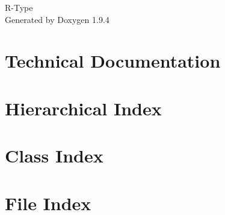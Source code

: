 \documentclass[twoside]{book}
\newcommand{\+}{\discretionary{\mbox{\scriptsize$\hookleftarrow$}}{}{}}
\newcommand{\clearemptydoublepage}{%
    \newpage{\pagestyle{empty}\cleardoublepage}%
  }
\begin{document}
  \raggedbottom
    \hypersetup{pageanchor=false,
                bookmarksnumbered=true,
                pdfencoding=unicode
               }
  \begin{titlepage}
  \vspace*{7cm}
  \begin{center}%
  {\Large R-\/\+Type}\\
  \vspace*{1cm}
  {\large Generated by Doxygen 1.9.4}\\
  \end{center}
  \end{titlepage}
  \clearemptydoublepage
  \tableofcontents
  \clearemptydoublepage
  \hypersetup{pageanchor=true}
\chapter{Technical Documentation}
\label{md_docs_technical_README}

\chapter{Hierarchical Index}

\chapter{Class Index}

\chapter{File Index}

\end{document}
